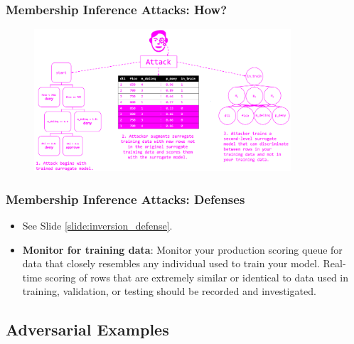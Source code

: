 \documentclass[11pt,
               aspectratio=169,
               hyperref={colorlinks}
               ]{beamer}
\begin{document}
			\begin{frame}[label={slide:membership}]
		
				\frametitle{Membership Inference Attacks: \textbf{How?}}		
			
				\begin{figure}[htb]
					\begin{center}
						\includegraphics[height=150pt]{../img/membership.PNG}
					\end{center}
				\end{figure}	

			\end{frame}
			
			\begin{frame}
		
				\frametitle{Membership Inference Attacks: \textbf{Defenses}}		
			
				\begin{itemize}
					\Large
					\item See Slide \ref{slide:inversion_defense}.
				\item \textbf{Monitor for training data}: Monitor your production scoring queue for data that closely resembles any individual used to train your model. Real-time scoring of rows that are extremely similar or identical to data used in training, validation, or testing should be recorded and investigated.
				\end{itemize}

			\end{frame}
	
		\subsection{Adversarial Examples}
	
\end{document}
